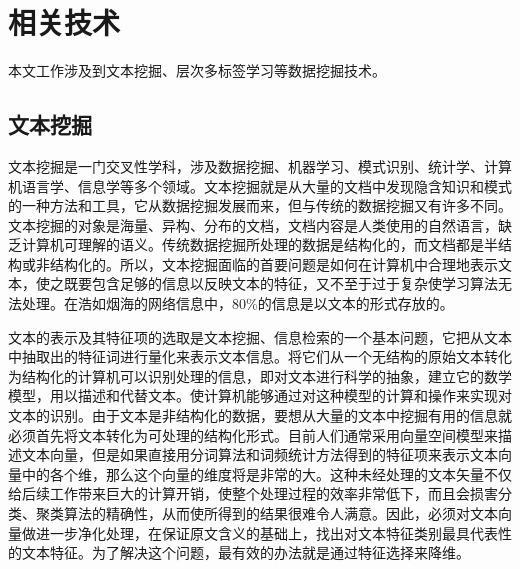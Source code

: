 ﻿%
\chapter{相关技术}
    本文工作涉及到文本挖掘、层次多标签学习等数据挖掘技术。

    \section{文本挖掘}
    文本挖掘是一门交叉性学科，涉及数据挖掘、机器学习、模式识别、统计学、计算机语言学、信息学等多个领域。文本挖掘就是从大量的文档中发现隐含知识和模式的一种方法和工具，它从数据挖掘发展而来，但与传统的数据挖掘又有许多不同。文本挖掘的对象是海量、异构、分布的文档，文档内容是人类使用的自然语言，缺乏计算机可理解的语义。传统数据挖掘所处理的数据是结构化的，而文档都是半结构或非结构化的。所以，文本挖掘面临的首要问题是如何在计算机中合理地表示文本，使之既要包含足够的信息以反映文本的特征，又不至于过于复杂使学习算法无法处理。在浩如烟海的网络信息中，80\%的信息是以文本的形式存放的。

    文本的表示及其特征项的选取是文本挖掘、信息检索的一个基本问题，它把从文本中抽取出的特征词进行量化来表示文本信息。将它们从一个无结构的原始文本转化为结构化的计算机可以识别处理的信息，即对文本进行科学的抽象，建立它的数学模型，用以描述和代替文本。使计算机能够通过对这种模型的计算和操作来实现对文本的识别。由于文本是非结构化的数据，要想从大量的文本中挖掘有用的信息就必须首先将文本转化为可处理的结构化形式。目前人们通常采用向量空间模型来描述文本向量，但是如果直接用分词算法和词频统计方法得到的特征项来表示文本向量中的各个维，那么这个向量的维度将是非常的大。这种未经处理的文本矢量不仅给后续工作带来巨大的计算开销，使整个处理过程的效率非常低下，而且会损害分类、聚类算法的精确性，从而使所得到的结果很难令人满意。因此，必须对文本向量做进一步净化处理，在保证原文含义的基础上，找出对文本特征类别最具代表性的文本特征。为了解决这个问题，最有效的办法就是通过特征选择来降维。
    
